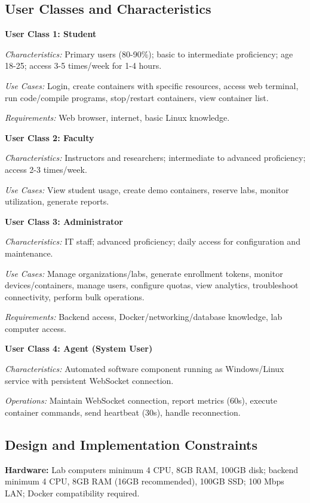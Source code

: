 \documentclass[12pt,a4paper]{article}
\begin{document}
\subsection{User Classes and Characteristics}

\textbf{User Class 1: Student}

\textit{Characteristics:} Primary users (80-90\%); basic to intermediate proficiency; age 18-25; access 3-5 times/week for 1-4 hours.

\textit{Use Cases:} Login, create containers with specific resources, access web terminal, run code/compile programs, stop/restart containers, view container list.

\textit{Requirements:} Web browser, internet, basic Linux knowledge.

\textbf{User Class 2: Faculty}

\textit{Characteristics:} Instructors and researchers; intermediate to advanced proficiency; access 2-3 times/week.

\textit{Use Cases:} View student usage, create demo containers, reserve labs, monitor utilization, generate reports.

\textbf{User Class 3: Administrator}

\textit{Characteristics:} IT staff; advanced proficiency; daily access for configuration and maintenance.

\textit{Use Cases:} Manage organizations/labs, generate enrollment tokens, monitor devices/containers, manage users, configure quotas, view analytics, troubleshoot connectivity, perform bulk operations.

\textit{Requirements:} Backend access, Docker/networking/database knowledge, lab computer access.

\textbf{User Class 4: Agent (System User)}

\textit{Characteristics:} Automated software component running as Windows/Linux service with persistent WebSocket connection.

\textit{Operations:} Maintain WebSocket connection, report metrics (60s), execute container commands, send heartbeat (30s), handle reconnection.

\subsection{Design and Implementation Constraints}

\textbf{Hardware:} Lab computers minimum 4 CPU, 8GB RAM, 100GB disk; backend minimum 4 CPU, 8GB RAM (16GB recommended), 100GB SSD; 100 Mbps LAN; Docker compatibility required.
\end{document}
